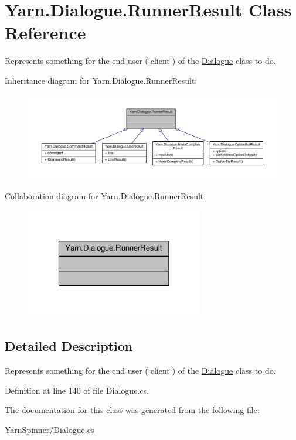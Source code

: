 \hypertarget{a00156}{\section{Yarn.\-Dialogue.\-Runner\-Result Class Reference}
\label{a00156}
}


Represents something for the end user (\char`\"{}client\char`\"{}) of the \hyperlink{a00092}{Dialogue} class to do.  




Inheritance diagram for Yarn.\-Dialogue.\-Runner\-Result\-:
\nopagebreak
\begin{figure}[H]
\begin{center}
\leavevmode
\includegraphics[width=350pt]{a00631}
\end{center}
\end{figure}


Collaboration diagram for Yarn.\-Dialogue.\-Runner\-Result\-:
\nopagebreak
\begin{figure}[H]
\begin{center}
\leavevmode
\includegraphics[width=220pt]{a00632}
\end{center}
\end{figure}


\subsection{Detailed Description}
Represents something for the end user (\char`\"{}client\char`\"{}) of the \hyperlink{a00092}{Dialogue} class to do. 

Definition at line 140 of file Dialogue.\-cs.



The documentation for this class was generated from the following file\-:\begin{DoxyCompactItemize}
\item 
Yarn\-Spinner/\hyperlink{a00305}{Dialogue.\-cs}\end{DoxyCompactItemize}
